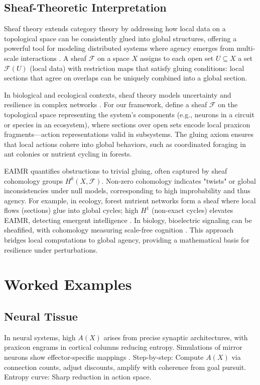 \documentclass{article}
\begin{document}
\subsection{Sheaf-Theoretic Interpretation}
Sheaf theory extends category theory by addressing how local data on a topological space can be consistently glued into global structures, offering a powerful tool for modeling distributed systems where agency emerges from multi-scale interactions \citep{spivak2024}. A sheaf \(\mathcal{F}\) on a space \(X\) assigns to each open set \(U \subseteq X\) a set \(\mathcal{F}(U)\) (local data) with restriction maps that satisfy gluing conditions: local sections that agree on overlaps can be uniquely combined into a global section.

In biological and ecological contexts, sheaf theory models uncertainty and resilience in complex networks \citep{stenzel2024}. For our framework, define a sheaf \(\mathcal{F}\) on the topological space representing the system's components (e.g., neurons in a circuit or species in an ecosystem), where sections over open sets encode local praxicon fragments—action representations valid in subsystems. The gluing axiom ensures that local actions cohere into global behaviors, such as coordinated foraging in ant colonies or nutrient cycling in forests.

EAIMR quantifies obstructions to trivial gluing, often captured by sheaf cohomology groups \(H^k(X, \mathcal{F})\). Non-zero cohomology indicates "twists" or global inconsistencies under null models, corresponding to high improbability and thus agency. For example, in ecology, forest nutrient networks form a sheaf where local flows (sections) glue into global cycles; high \(H^1\) (non-exact cycles) elevates EAIMR, detecting emergent intelligence \citep{levin2019}. In biology, bioelectric signaling can be sheafified, with cohomology measuring scale-free cognition \citep{levin2019, spivak2024}. This approach bridges local computations to global agency, providing a mathematical basis for resilience under perturbations.

\section{Worked Examples}
\label{sec:examples}

\subsection{Neural Tissue}
In neural systems, high \(A(X)\) arises from precise synaptic architectures, with praxicon engrams in cortical columns reducing entropy. Simulations of mirror neurons show effector-specific mappings \citep{vannuscorps2023}. Step-by-step: Compute \(A(X)\) via connection counts, adjust discounts, amplify with coherence from goal pursuit. Entropy curve: Sharp reduction in action space.
\end{document}
